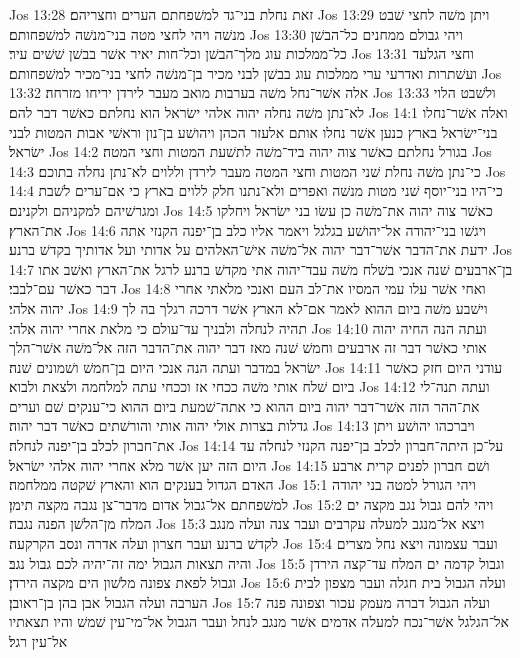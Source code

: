 Jos 13:28  זאת נחלת בני־גד למשׁפחתם הערים וחצריהם׃
Jos 13:29  ויתן משׁה לחצי שׁבט מנשׁה ויהי לחצי מטה בני־מנשׁה למשׁפחותם׃
Jos 13:30  ויהי גבולם ממחנים כל־הבשׁן כל־ממלכות עוג מלך־הבשׁן וכל־חות יאיר אשׁר בבשׁן שׁשׁים עיר׃
Jos 13:31  וחצי הגלעד ועשׁתרות ואדרעי ערי ממלכות עוג בבשׁן לבני מכיר בן־מנשׁה לחצי בני־מכיר למשׁפחותם׃
Jos 13:32  אלה אשׁר־נחל משׁה בערבות מואב מעבר לירדן יריחו מזרחה׃
Jos 13:33  ולשׁבט הלוי לא־נתן משׁה נחלה יהוה אלהי ישׂראל הוא נחלתם כאשׁר דבר להם׃
Jos 14:1  ואלה אשׁר־נחלו בני־ישׂראל בארץ כנען אשׁר נחלו אותם אלעזר הכהן ויהושׁע בן־נון וראשׁי אבות המטות לבני ישׂראל׃
Jos 14:2  בגורל נחלתם כאשׁר צוה יהוה ביד־משׁה לתשׁעת המטות וחצי המטה׃
Jos 14:3  כי־נתן משׁה נחלת שׁני המטות וחצי המטה מעבר לירדן וללוים לא־נתן נחלה בתוכם׃
Jos 14:4  כי־היו בני־יוסף שׁני מטות מנשׁה ואפרים ולא־נתנו חלק ללוים בארץ כי אם־ערים לשׁבת ומגרשׁיהם למקניהם ולקנינם׃
Jos 14:5  כאשׁר צוה יהוה את־משׁה כן עשׂו בני ישׂראל ויחלקו את־הארץ׃
Jos 14:6  ויגשׁו בני־יהודה אל־יהושׁע בגלגל ויאמר אליו כלב בן־יפנה הקנזי אתה ידעת את־הדבר אשׁר־דבר יהוה אל־משׁה אישׁ־האלהים על אדותי ועל אדותיך בקדשׁ ברנע׃
Jos 14:7  בן־ארבעים שׁנה אנכי בשׁלח משׁה עבד־יהוה אתי מקדשׁ ברנע לרגל את־הארץ ואשׁב אתו דבר כאשׁר עם־לבבי׃
Jos 14:8  ואחי אשׁר עלו עמי המסיו את־לב העם ואנכי מלאתי אחרי יהוה אלהי׃
Jos 14:9  וישׁבע משׁה ביום ההוא לאמר אם־לא הארץ אשׁר דרכה רגלך בה לך תהיה לנחלה ולבניך עד־עולם כי מלאת אחרי יהוה אלהי׃
Jos 14:10  ועתה הנה החיה יהוה אותי כאשׁר דבר זה ארבעים וחמשׁ שׁנה מאז דבר יהוה את־הדבר הזה אל־משׁה אשׁר־הלך ישׂראל במדבר ועתה הנה אנכי היום בן־חמשׁ ושׁמונים שׁנה׃
Jos 14:11  עודני היום חזק כאשׁר ביום שׁלח אותי משׁה ככחי אז וככחי עתה למלחמה ולצאת ולבוא׃
Jos 14:12  ועתה תנה־לי את־ההר הזה אשׁר־דבר יהוה ביום ההוא כי אתה־שׁמעת ביום ההוא כי־ענקים שׁם וערים גדלות בצרות אולי יהוה אותי והורשׁתים כאשׁר דבר יהוה׃
Jos 14:13  ויברכהו יהושׁע ויתן את־חברון לכלב בן־יפנה לנחלה׃
Jos 14:14  על־כן היתה־חברון לכלב בן־יפנה הקנזי לנחלה עד היום הזה יען אשׁר מלא אחרי יהוה אלהי ישׂראל׃
Jos 14:15  ושׁם חברון לפנים קרית ארבע האדם הגדול בענקים הוא והארץ שׁקטה ממלחמה׃
Jos 15:1  ויהי הגורל למטה בני יהודה למשׁפחתם אל־גבול אדום מדבר־צן נגבה מקצה תימן׃
Jos 15:2  ויהי להם גבול נגב מקצה ים המלח מן־הלשׁן הפנה נגבה׃
Jos 15:3  ויצא אל־מנגב למעלה עקרבים ועבר צנה ועלה מנגב לקדשׁ ברנע ועבר חצרון ועלה אדרה ונסב הקרקעה׃
Jos 15:4  ועבר עצמונה ויצא נחל מצרים והיה תצאות הגבול ימה זה־יהיה לכם גבול נגב׃
Jos 15:5  וגבול קדמה ים המלח עד־קצה הירדן וגבול לפאת צפונה מלשׁון הים מקצה הירדן׃
Jos 15:6  ועלה הגבול בית חגלה ועבר מצפון לבית הערבה ועלה הגבול אבן בהן בן־ראובן׃
Jos 15:7  ועלה הגבול דברה מעמק עכור וצפונה פנה אל־הגלגל אשׁר־נכח למעלה אדמים אשׁר מנגב לנחל ועבר הגבול אל־מי־עין שׁמשׁ והיו תצאתיו אל־עין רגל׃
